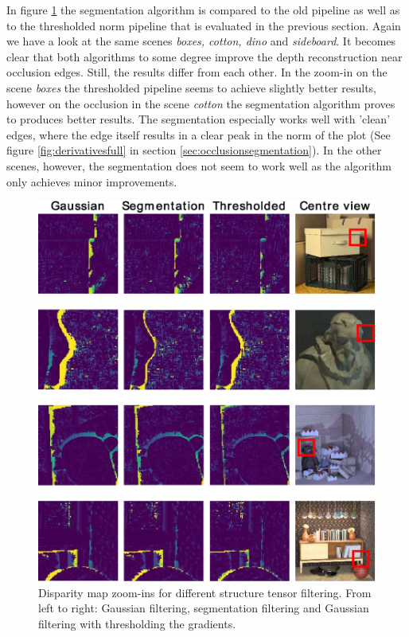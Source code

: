 \documentclass  [
  paper    = a4,
  BCOR     = 10mm,
  twoside,
  fontsize = 12pt,
  fleqn,
  toc      = bibnumbered,
  toc      = listofnumbered,
  numbers  = noendperiod,
  headings = normal,
  listof   = leveldown,
  version  = 3.03
]                                       {scrreprt}
\begin{document}
In figure \ref{fig:threshresultsmorph} the segmentation algorithm is compared to the old pipeline as well as to the thresholded norm pipeline that is evaluated in the previous section. Again we have a look at the same scenes \textit{boxes, cotton, dino} and \textit{sideboard}. It becomes clear that both algorithms to some degree improve the depth reconstruction near occlusion edges. Still, the results differ from each other. In the zoom-in on the scene \textit{boxes} the thresholded pipeline seems to achieve slightly better results, however on the occlusion in the scene \textit{cotton} the segmentation algorithm proves to produces better results. The segmentation especially works well with 'clean' edges, where the edge itself results in a clear peak in the norm of the plot (See figure \ref{fig:derivativesfull} in section \ref{sec:occlusionsegmentation}). In the other scenes, however, the segmentation does not seem to work well as the algorithm only achieves minor improvements.
\begin{figure}[h!]
	\centering
	\includegraphics[width=1\linewidth]{images/thresh_results_morph}
	\caption[Disparity map zoom-ins for different methods]{Disparity map zoom-ins for different structure tensor filtering. From left to right: Gaussian filtering, segmentation filtering and Gaussian filtering with thresholding the gradients.}
	\label{fig:threshresultsmorph}
\end{figure}
\end{document}
